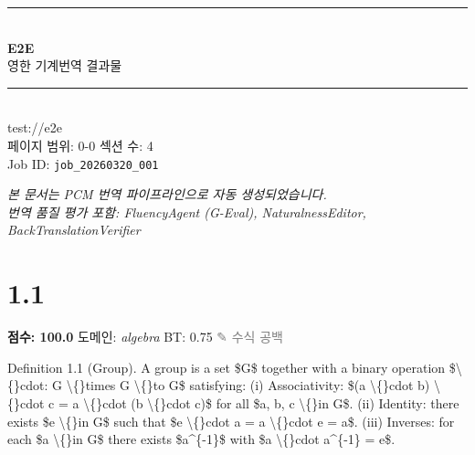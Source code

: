 \documentclass[11pt,a4paper,oneside]{memoir}
\begin{document}
\begin{titlingpage}
\vspace*{3cm}
{\sffamily
  \begin{center}
    {\color{ChapterBlue}\rule{\textwidth}{2pt}}\\[1em]
    {\Huge\bfseries E2E}\\[0.8em]
    {\large 영한 기계번역 결과물}\\[0.5em]
    {\color{ChapterBlue}\rule{\textwidth}{1pt}}\\[2em]
    {\normalsize\ttfamily test://e2e}\\[0.3em]
    {\small 페이지 범위: 0-0 \quad 섹션 수: 4}\\[0.5em]
    {\small\color{gray} Job ID: \texttt{job\_20260320\_001}}
  \end{center}
}
\vfill
{\small\color{gray} \textit{본 문서는 PCM 번역 파이프라인으로 자동 생성되었습니다.\\
번역 품질 평가 포함: FluencyAgent (G-Eval), NaturalnessEditor, BackTranslationVerifier}}
\end{titlingpage}

\clearpage
\tableofcontents*
\clearpage

\section{1.1}
\noindent \textbf{\color{ScoreGreen}점수: 100.0} \quad 도메인: \textit{algebra}  \quad \textcolor{ScoreGreen}{BT: 0.75} \quad \textcolor{gray}{\small ✎ 수식 공백}
\vspace{0.4em}

\begin{tcolorbox}[origstyle]
\small Definition 1.1 (Group). A group is a set \$G\$ together with a binary operation \$\textbackslash\{\}cdot: G \textbackslash\{\}times G \textbackslash\{\}to G\$ satisfying: (i) Associativity: \$(a \textbackslash\{\}cdot b) \textbackslash\{\}cdot c = a \textbackslash\{\}cdot (b \textbackslash\{\}cdot c)\$ for all \$a, b, c \textbackslash\{\}in G\$. (ii) Identity: there exists \$e \textbackslash\{\}in G\$ such that \$e \textbackslash\{\}cdot a = a \textbackslash\{\}cdot e = a\$. (iii) Inverses: for each \$a \textbackslash\{\}in G\$ there exists \$a\textasciicircum{}\{-1\}\$ with \$a \textbackslash\{\}cdot a\textasciicircum{}\{-1\} = e\$.
\end{tcolorbox}
\vspace{0.3em}
\end{document}
